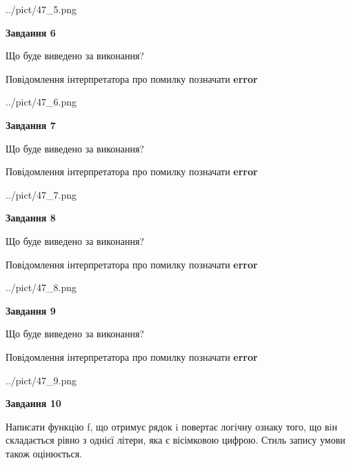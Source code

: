 \documentclass[12pt, ukrainian]{article}
\begin{document}
{\begin {large}
\begin{center}
	{../pict/47_5.png}
\end{center}
\newpage

{\begin {center}\textbf{Завдання 6}\end {center}}\par
Що буде виведено за виконання? \par
Повідомлення інтерпретатора про помилку позначати \textbf{error}

\begin{center}
	{../pict/47_6.png}
\end{center}
\newpage

{\begin {center}\textbf{Завдання 7}\end {center}}\par
Що буде виведено за виконання? \par
Повідомлення інтерпретатора про помилку позначати \textbf{error}

\begin{center}
	{../pict/47_7.png}
\end{center}
\newpage

{\begin {center}\textbf{Завдання 8}\end {center}}\par
Що буде виведено за виконання? \par
Повідомлення інтерпретатора про помилку позначати \textbf{error}

\begin{center}
	{../pict/47_8.png}
\end{center}
\newpage

{\begin {center}\textbf{Завдання 9}\end {center}}\par
Що буде виведено за виконання? \par
Повідомлення інтерпретатора про помилку позначати \textbf{error}

\begin{center}
	{../pict/47_9.png}
\end{center}
\newpage

{\begin {center}\textbf{Завдання 10}\end {center}}\par

Написати функцiю f, що отримує рядок i повертає логічну ознаку того, що вiн складається рівно з однієї літери, яка є вісімковою цифрою. Стиль запису умови також оцінюється.\par
\newpage

\end {large}}
\end{document}
